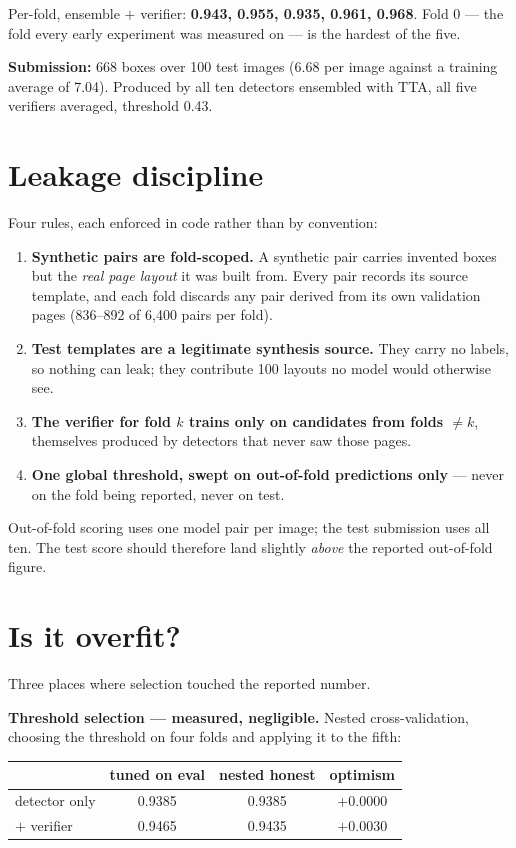\documentclass[11pt,a4paper]{article}
\begin{document}
Per-fold, ensemble $+$ verifier: \textbf{0.943, 0.955, 0.935, 0.961, 0.968}. Fold 0 --- the fold
every early experiment was measured on --- is the hardest of the five.

\textbf{Submission:} 668 boxes over 100 test images (6.68 per image against a training average of
7.04). Produced by all ten detectors ensembled with TTA, all five verifiers averaged, threshold
0.43.

\section{Leakage discipline}

Four rules, each enforced in code rather than by convention:

\begin{enumerate}[leftmargin=1.6em]
\item \textbf{Synthetic pairs are fold-scoped.} A synthetic pair carries invented boxes but the
\emph{real page layout} it was built from. Every pair records its source template, and each fold
discards any pair derived from its own validation pages (836--892 of 6{,}400 pairs per fold).
\item \textbf{Test templates are a legitimate synthesis source.} They carry no labels, so nothing
can leak; they contribute 100 layouts no model would otherwise see.
\item \textbf{The verifier for fold $k$ trains only on candidates from folds $\neq k$}, themselves
produced by detectors that never saw those pages.
\item \textbf{One global threshold, swept on out-of-fold predictions only} --- never on the fold
being reported, never on test.
\end{enumerate}

Out-of-fold scoring uses one model pair per image; the test submission uses all ten. The test score
should therefore land slightly \emph{above} the reported out-of-fold figure.

\section{Is it overfit?}

Three places where selection touched the reported number.

\textbf{Threshold selection --- measured, negligible.} Nested cross-validation, choosing the
threshold on four folds and applying it to the fifth:

\begin{table}[h!]
\centering
\small
\renewcommand{\arraystretch}{1.25}
\begin{tabular}{@{}lccc@{}}
\toprule
 & \textbf{tuned on eval} & \textbf{nested honest} & \textbf{optimism} \\
\midrule
detector only & 0.9385 & 0.9385 & $+$0.0000 \\
$+$ verifier & 0.9465 & 0.9435 & $+$0.0030 \\
\bottomrule
\end{tabular}
\end{table}
\end{document}

